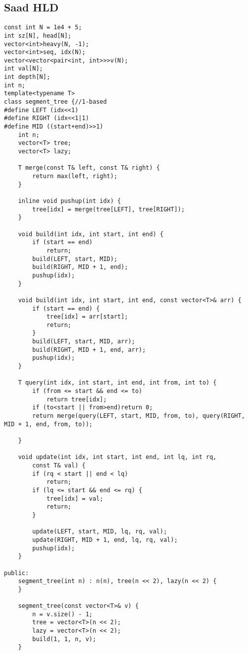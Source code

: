 \subsection{Saad HLD}

\begin{lstlisting}[style=cpp]
const int N = 1e4 + 5;
int sz[N], head[N];
vector<int>heavy(N, -1);
vector<int>seq, idx(N);
vector<vector<pair<int, int>>>v(N);
int val[N];
int depth[N];
int n;
template<typename T>
class segment_tree {//1-based
#define LEFT (idx<<1)
#define RIGHT (idx<<1|1)
#define MID ((start+end)>>1)
    int n;
    vector<T> tree;
    vector<T> lazy;

    T merge(const T& left, const T& right) {
        return max(left, right);
    }

    inline void pushup(int idx) {
        tree[idx] = merge(tree[LEFT], tree[RIGHT]);
    }

    void build(int idx, int start, int end) {
        if (start == end)
            return;
        build(LEFT, start, MID);
        build(RIGHT, MID + 1, end);
        pushup(idx);
    }

    void build(int idx, int start, int end, const vector<T>& arr) {
        if (start == end) {
            tree[idx] = arr[start];
            return;
        }
        build(LEFT, start, MID, arr);
        build(RIGHT, MID + 1, end, arr);
        pushup(idx);
    }

    T query(int idx, int start, int end, int from, int to) {
        if (from <= start && end <= to)
            return tree[idx];
        if (to<start || from>end)return 0;
        return merge(query(LEFT, start, MID, from, to), query(RIGHT, MID + 1, end, from, to));
        
    }

    void update(int idx, int start, int end, int lq, int rq,
        const T& val) {
        if (rq < start || end < lq)
            return;
        if (lq <= start && end <= rq) {
            tree[idx] = val;
            return;
        }
       
        update(LEFT, start, MID, lq, rq, val);
        update(RIGHT, MID + 1, end, lq, rq, val);
        pushup(idx);
    }

public:
    segment_tree(int n) : n(n), tree(n << 2), lazy(n << 2) {
    }

    segment_tree(const vector<T>& v) {
        n = v.size() - 1;
        tree = vector<T>(n << 2);
        lazy = vector<T>(n << 2);
        build(1, 1, n, v);
    }


\end{lstlisting}
